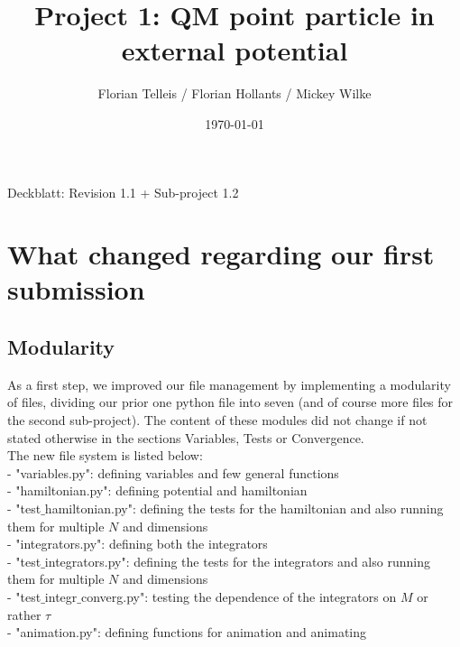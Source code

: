 \documentclass[11pt, letterpaper, onecolumn]{article}
\title{Project 1: QM point particle in external potential}
\author{Florian Telleis / Florian Hollants / Mickey Wilke}
\date{\today}
\begin{document}
	
		Deckblatt: Revision 1.1 + Sub-project 1.2 
		
		\newpage
	
	
	
	
	
	
	\tableofcontents
	
	
	
	
	
	\vspace{0.5cm}
	
	
	\section{What changed regarding our first submission}
	
	\subsection{Modularity}
	As a first step, we improved our file management by implementing a modularity of files, dividing our prior one python file into seven (and of course more files for the second sub-project). The content of these modules did not change if not stated otherwise in the sections Variables, Tests or Convergence. \\
	The new file system is listed below: \\ 
	- "variables.py": defining variables and few general functions\\
	- "hamiltonian.py": defining potential and hamiltonian\\
	- "test$\_$hamiltonian.py": defining the tests for the hamiltonian and also running them for multiple $N$ and dimensions \\
	- "integrators.py": defining both the integrators \\
	- "test$\_$integrators.py": defining the tests for the integrators and also running them for multiple $N$ and dimensions \\
	- "test$\_$integr$\_$converg.py": testing the dependence of the integrators on $M$ or rather $\tau$ \\
	- "animation.py": defining functions for animation and animating
\end{document}

